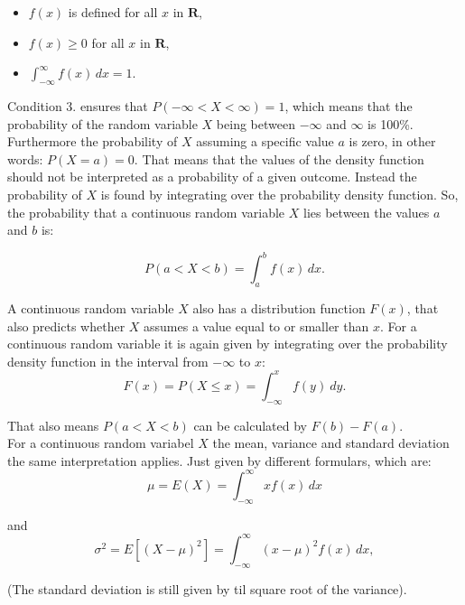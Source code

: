 \begin{itemize}
	\item $f(x)$ is defined for all $x$ in $\textbf{R}$,
	\item $f(x) \geq 0$ for all $x$ in $\textbf{R}$,
	\item $\int_{-\infty}^{\infty} f(x) \, dx = 1.$
\end{itemize}

\noindent Condition 3. ensures that $P(-\infty < X < \infty) = 1$, which means that the probability of the random variable $X$ being between $-\infty$ and $\infty$ is 100\%. Furthermore the probability of $X$ assuming a specific value $a$ is zero, in other words: $P(X=a)=0$. That means that the values of the density function should not be interpreted as a probability of a given outcome. Instead the probability of $X$ is found by integrating over the probability density function. So, the probability that a continuous random variable $X$ lies between the values $a$ and $b$ is: 

\begin{equation}
P(a < X < b) = \int_a^b f(x) \, dx.
\end{equation}


\noindent A continuous random variable $X$ also has a distribution function $F(x)$, that also predicts whether $X$ assumes a value equal to or smaller than $x$. For a continuous random variable it is again given by integrating over the probability density function in the interval from $-\infty$ to $x$:
\begin{equation}
F(x) = P(X \leq x) = \int_{-\infty}^{x} f(y) \ dy.
\end{equation}


\noindent That also means $P(a<X<b)$ can be calculated by $F(b)-F(a)$.
\\

\noindent For a continuous random variabel $X$ the mean, variance and standard deviation the same interpretation applies. Just given by different formulars, which are:
\begin{equation}
	\mu = E(X) = \int_{-\infty}^{\infty} x f(x) \, dx
\end{equation}

\noindent and
\begin{equation}
\sigma^2 = E\left[(X - \mu)^2\right] = \int_{-\infty}^{\infty} (x - \mu)^2 f(x) \, dx,
\end{equation}

\noindent (The standard deviation is still given by til square root of the variance).

